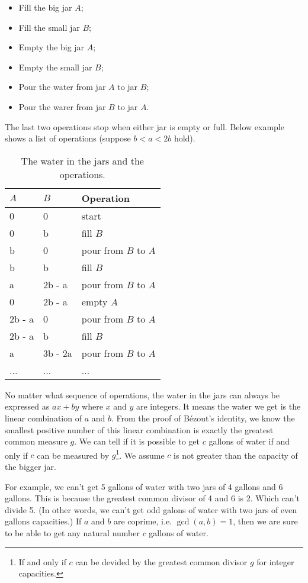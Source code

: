 \documentclass{article}
\begin{document}
\begin{itemize}
\item Fill the big jar $A$;
\item Fill the small jar $B$;
\item Empty the big jar $A$;
\item Empty the small jar $B$;
\item Pour the water from jar $A$ to jar $B$;
\item Pour the warer from jar $B$ to jar $A$.
\end{itemize}

The last two operations stop when either jar is empty or full. Below example shows a list of operations (suppose $b < a < 2b$ hold).

\begin{table}[htbp]
\centering
\begin{tabular}{l|l|l}
$A$ & $B$ & Operation \\
\hline
0 & 0 & start \\
0 & b & fill $B$ \\
b & 0 & pour from $B$ to $A$ \\
b & b & fill $B$ \\
a & 2b - a & pour from $B$ to $A$ \\
0 & 2b - a & empty $A$ \\
2b - a & 0 & pour from $B$ to $A$ \\
2b - a & b & fill $B$ \\
a & 3b - 2a & pour from $B$ to $A$ \\
... & ... & ... \\
\end{tabular}
\caption{The water in the jars and the operations.} \label{tab:jug-ops}
\end{table}

No matter what sequence of operations, the water in the jars can always be expressed as $ax + by$ where $x$ and $y$ are integers. It means the water we get is the linear combination of $a$ and $b$. From the proof of Bézout's identity, we know the smallest positive number of this linear combination is exactly the greatest common measure $g$. We can tell if it is possible to get $c$ gallons of water if and only if $c$ can be measured by $g$\footnote{If and only if $c$ can be devided by the greatest common divisor $g$ for integer capacities.}. We assume $c$ is not greater than the capacity of the bigger jar.

For example, we can't get 5 gallons of water with two jars of 4 gallons and 6 gallons. This is because the greatest common divisor of 4 and 6 is 2. Which can't divide 5. (In other words, we can't get odd galons of water with two jars of even gallons capacities.) If $a$ and $b$ are coprime, i.e. $\gcd(a, b) = 1$, then we are sure to be able to get any natural number $c$ gallons of water.
\end{document}
